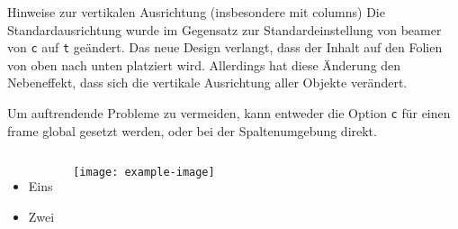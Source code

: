 \documentclass[
	german,%
	accentcolor=9c,%
]{tudabeamer}
\newcommand*{\code}[1]{\texttt{#1}}
\begin{document}
\begin{frame}{Hinweise zur vertikalen Ausrichtung (insbesondere mit columns)}
	Die Standardausrichtung wurde im Gegensatz zur Standardeinstellung von beamer von \code{c} auf \code{t} geändert.
	Das neue Design verlangt, dass der Inhalt auf den Folien von oben nach unten platziert wird.
	Allerdings hat diese Änderung den Nebeneffekt, dass sich die vertikale Ausrichtung aller Objekte verändert.

	Um auftrendende Probleme zu vermeiden, kann entweder die Option \code{c} für einen frame global gesetzt werden, oder bei der Spaltenumgebung direkt.

	\begin{columns}[onlytextwidth,c]
		\begin{itemize}
			\item Eins
			\item Zwei
		\end{itemize}
		\texttt{[image: example-image]}
	\end{columns}
\end{frame}
\end{document}
